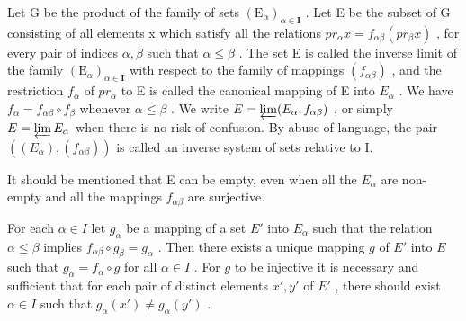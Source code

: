 Let G be the product of the family of sets \((\mathrm{E}_{\alpha})_{\alpha\in\mathbf{I}}\) . Let E be the subset of G consisting of all elements x which satisfy all the relations \(pr_{\alpha}x = f_{\alpha\beta}(pr_{\beta}x)\) , for every pair of indices \(\alpha, \beta\) such that \(\alpha \leqslant \beta\) . The set E is called the inverse limit of the family \((\mathrm{E}_{\alpha})_{\alpha\in\mathbf{I}}\) with respect to the family of mappings \((f_{\alpha\beta})\) , and the restriction \(f_{\alpha}\) of \(pr_{\alpha}\) to E is called the canonical mapping of E into \(E_{\alpha}\) . We have \(f_{\alpha} = f_{\alpha\beta} \circ f_{\beta}\) whenever \(\alpha \leqslant \beta\) . We write \(E = \varprojlim(E_{\alpha}, f_{\alpha\beta})\) , or simply \(E = \varprojlim E_{\alpha}\) when there is no risk of confusion. By abuse of language, the pair \(((E_{\alpha}), (f_{\alpha\beta}))\) is called an inverse system of sets relative to I.

It should be mentioned that E can be empty, even when all the \(E_{\alpha}\) are non-empty and all the mappings \(f_{\alpha\beta}\) are surjective.

For each \(\alpha \in I\) let \(g_{\alpha}\) be a mapping of a set \(E'\) into \(E_{\alpha}\) such that the relation \(\alpha \leqslant \beta\) implies \(f_{\alpha \beta} \circ g_{\beta} = g_{\alpha}\) . Then there exists a unique mapping \(g\) of \(E'\) into \(E\) such that \(g_{\alpha} = f_{\alpha} \circ g\) for all \(\alpha \in I\) . For \(g\) to be injective it is necessary and sufficient that for each pair of distinct elements \(x', y'\) of \(E'\) , there should exist \(\alpha \in I\) such that \(g_{\alpha}(x') \neq g_{\alpha}(y')\) .

